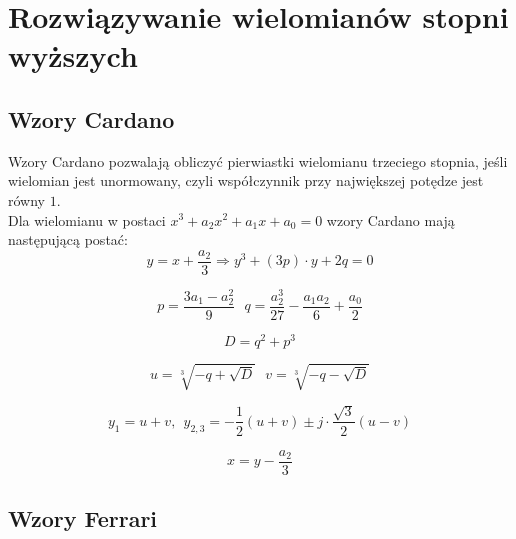 \section*{Rozwiązywanie wielomianów stopni wyższych}
\subsection*{Wzory Cardano}
Wzory Cardano pozwalają obliczyć pierwiastki wielomianu trzeciego stopnia,
jeśli wielomian jest unormowany, czyli współczynnik przy największej
potędze jest równy $1$.\\
Dla wielomianu w postaci $x^3 + a_2x^2 + a_1x + a_0 = 0$ wzory
Cardano mają następującą postać:
\begin{equation*}
    y = x + \frac{a_2}{3} \Rightarrow y^3 + (3p) \cdot y + 2q = 0
\end{equation*}

\begin{equation*}
    p = \frac{3a_1 - a_2^2}{9}\ \ \ 
    q = \frac{a_2^3}{27} - \frac{a_1 a_2}{6} + \frac{a_0}{2}
\end{equation*}

\begin{equation*}
    D = q^2 + p^3
\end{equation*}

\begin{equation*}
    u = \sqrt[3]{- q + \sqrt{D}}\ \ \ 
    v = \sqrt[3]{- q - \sqrt{D}}
\end{equation*}

\begin{equation*}
    y_1 = u + v,\ \ y_{2,3} = -\frac{1}{2}\left(u+v\right)
    \pm j \cdot \frac{\sqrt{3}}{2}\left(u-v\right)
\end{equation*}

\begin{equation*}
    x = y - \frac{a_2}{3}
\end{equation*}

\subsection*{Wzory Ferrari}